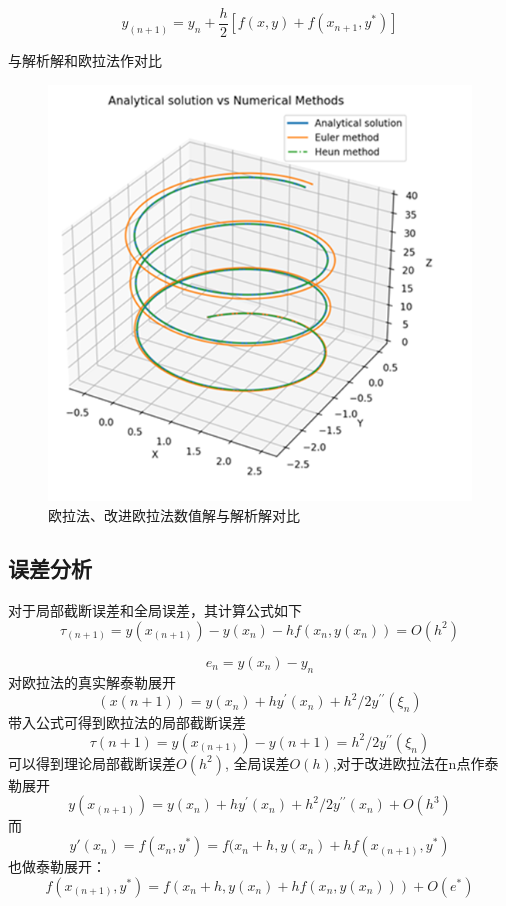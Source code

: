 \documentclass[11pt]{article}
\begin{document}
\begin{equation*}
    y_{(n+1)}=y_n+\frac{h}{2}[f(x,y)+f(x_{n+1},y^*)]
\end{equation*}

与解析解和欧拉法作对比
\begin{figure}[h!]
    \centering
    \includegraphics[width=0.5\linewidth]{Fig/Heun Method.png}
    \caption{欧拉法、改进欧拉法数值解与解析解对比}
    \label{fig:2}
\end{figure}

\subsection{误差分析}
对于局部截断误差和全局误差，其计算公式如下
\begin{equation*}
    \tau_{\left(n+1\right)}=y\left(x_{\left(n+1\right)}\right)-y\left(x_n\right)-hf\left(x_n,y\left(x_n\right)\right)=O\left(h^2\right)
\end{equation*}

\begin{equation*}
    e_n=y\left(x_n\right)-y_n
\end{equation*}
对欧拉法的真实解泰勒展开
\begin{equation*}
    \left(x\left(n+1\right)\right)=y\left(x_n\right)+hy^\prime\left(x_n\right)+h^2/2y^{\prime\prime}\left(\xi_n\right)
\end{equation*}
带入公式可得到欧拉法的局部截断误差
\begin{equation*}
    \tau\left(n+1\right)=y\left(x_{\left(n+1\right)}\right)-y\left(n+1\right)=h^2/2y^{\prime\prime}\left(\xi_n\right)
\end{equation*}
可以得到理论局部截断误差$O(h^2)$, 全局误差$O(h)$,对于改进欧拉法在n点作泰勒展开
\begin{equation*}
    y\left(x_{\left(n+1\right)}\right)=y\left(x_n\right)+hy^\prime\left(x_n\right)+h^2/2y^{\prime\prime}\left(x_n\right)+O\left(h^3\right)
\end{equation*}
而 $$y'(x_n)=f(x_n,y^*)=f(x_n+h,y(x_n)+hf(x_{(n+1)},y^*)$$也做泰勒展开：
\begin{equation*}
    f\left(x_{\left(n+1\right)},y^\ast\right)=f\left(x_n+h,y\left(x_n\right)+hf\left(x_n,y\left(x_n\right)\right)\right)+O\left(e^\ast\right)
\end{equation*}
\end{document}
